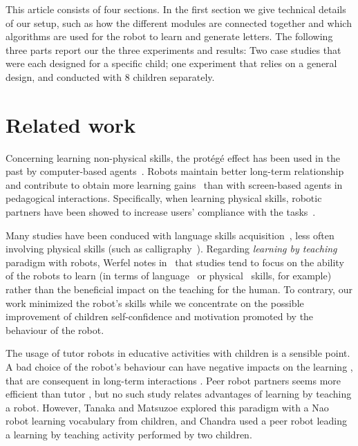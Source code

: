 \documentclass[conference]{IEEEtran}
\begin{document}
This article consists of four sections. In the first section we give technical details of our setup, such as how the different modules are connected
together and which algorithms are used for the robot to learn and generate letters.
The following three parts report our the three experiments and results: Two case studies that were each designed for a specific child; one experiment that relies on a general design, and conducted with 8 children separately.

\section{Related work}

Concerning learning non-physical skills, the prot\'eg\'e effect has been used in the past by computer-based agents~\cite{Chase2009}.
Robots maintain better long-term relationship~\cite{Kidd2008} and contribute to obtain more learning gains~\cite{Leyzberg2014} than with screen-based agents in pedagogical interactions. Specifically, when learning physical skills, robotic partners have been showed to increase users' compliance with the tasks~\cite{Bainbridge2011}.

Many studies have been conduced with language skills
acquisition~\cite{han2010robot}, less often involving physical skills (such as
calligraphy~\cite{Matsui2013}). Regarding \textit{learning by teaching} paradigm with
robots, Werfel notes in~\cite{Werfel2014} that studies tend to focus on the
ability of the robots to learn (in terms of language~\cite{Saunders2010} or
physical~\cite{Mulling2013} skills, for example) rather than the beneficial impact
on the teaching for the human. To contrary, our work minimized the robot's skills while we
concentrate on the possible improvement of children self-confidence and
motivation promoted by the behaviour of the robot.

The usage of tutor robots in educative activities with children is a sensible point. A bad choice of the robot's behaviour can have negative impacts on the learning \cite{kennedy2015robot}, that are consequent in long-term interactions \cite{leite2014empathic}. Peer robot partners seems more efficient than tutor \cite{zaga2015effect}, but no such study relates advantages of learning by teaching a robot. However, Tanaka and Matsuzoe \cite{Tanaka2012} explored this paradigm with a Nao robot learning vocabulary from children, and Chandra \cite{chandra2015can} used a peer robot leading a learning by teaching activity performed by two children.
\end{document}
